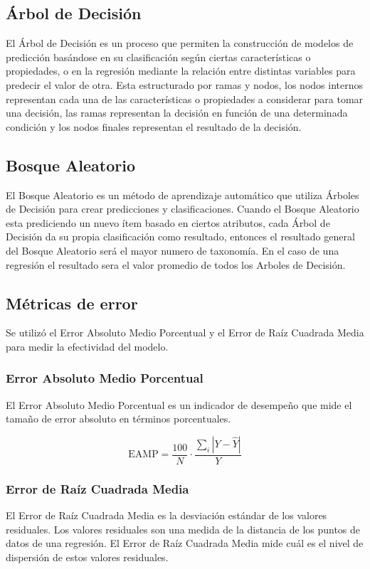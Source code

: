 \documentclass{article}
\begin{document}
\subsection{Árbol de Decisión}
El Árbol de Decisión es un proceso que permiten la construcción de modelos de predicción basándose en su clasificación según ciertas características o propiedades, o en la regresión mediante la relación entre distintas variables para predecir el valor de otra. Esta estructurado por ramas y nodos, los nodos internos representan cada una de las características o propiedades a considerar para tomar una decisión, las ramas representan la decisión en función de una determinada condición y los nodos finales representan el resultado de la decisión.

\subsection{Bosque Aleatorio}
El Bosque Aleatorio es un método de aprendizaje automático que utiliza Árboles de Decisión para crear predicciones y clasificaciones. Cuando el Bosque Aleatorio esta prediciendo un nuevo ítem basado en ciertos atributos, cada Árbol de Decisión da su propia clasificación como resultado, entonces el resultado general del Bosque Aleatorio será el mayor numero de taxonomía. En el caso de una regresión el resultado sera el valor promedio de todos los Arboles de Decisión.   

\subsection{Métricas de error}
Se utilizó el Error Absoluto Medio Porcentual y el Error de Raíz Cuadrada Media para medir la efectividad del modelo.

\subsubsection{Error Absoluto Medio Porcentual}
El Error Absoluto Medio Porcentual es un indicador de desempeño que mide el tamaño de error absoluto en términos porcentuales.

$$\text{EAMP} = \frac{100}{N} \cdot   \frac{\sum_{i}\left| Y - \hat{Y}\right|}{Y}$$

\subsubsection{Error de Raíz Cuadrada Media}
El Error de Raíz Cuadrada Media es la desviación estándar de los valores residuales. Los valores residuales son una medida de la distancia de los puntos de datos de una regresión. El Error de Raíz Cuadrada Media mide cuál es el nivel de dispersión de estos valores residuales.
\end{document}
